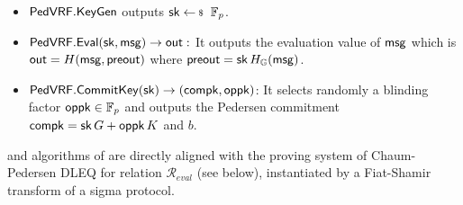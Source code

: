\begin{itemize}
	\item ${\mathsf{PedVRF}}.{\mathsf{KeyGen}}$  outputs  $\sk \leftsample \F_p$. %
	\item ${\mathsf{PedVRF}}.{\mathsf{Eval}}(\mathsf{sk},\mathsf{msg}) \rightarrow {\ensuremath{\mathsf{out}}}:$ It outputs the evaluation value of $ \mathsf{msg} $ which is $ {\mathsf{out}} = H(\mathsf{msg}, {\mathsf{preout}}) $  where ${\mathsf{preout}} = \mathsf{sk} \, H_{{\mathbb{G}}}(\mathsf{msg})$.



\item ${\mathsf{PedVRF}}.{\mathsf{CommitKey}}(\mathsf{sk}) \rightarrow (\mathsf{compk}, \mathsf{oppk}) $: It selects randomly a blinding factor $ \mathsf{oppk} \in \mathbb{F}_p $ and outputs the Pedersen commitment $ \mathsf{compk} =   \mathsf{sk} \, G + \mathsf{oppk} \, K$ and $ b $.  
\end{itemize}

 \Sign and \Verify algorithms of \PedVRF are directly  aligned with the proving system of Chaum-Pedersen DLEQ for relation $\mathcal{R}_{eval}$ (see below),
instantiated by a Fiat-Shamir transform of a sigma protocol.





